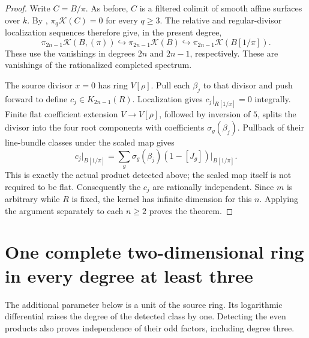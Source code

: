 \documentclass[11pt,a4paper]{amsart}
\numberwithin{equation}{section}
\theoremstyle{definition}
\theoremstyle{remark}
\begin{document}
\begin{proof}
Write $C=B/\pi$.  As before, $C$ is a filtered colimit of smooth
affine surfaces over $k$.  By
\cite[Theorem~8.4]{GeisserLevineCharP},
$\pi_q\mathcal K(C)=0$ for every $q\geq3$.
The relative and regular-divisor localization sequences therefore
give, in the present degree,
\[
 \pi_{2n-1}\mathcal K(B,(\pi))
 \hookrightarrow\pi_{2n-1}\mathcal K(B)
 \hookrightarrow\pi_{2n-1}\mathcal K(B[1/\pi]).
\]
These use the vanishings in degrees $2n$ and $2n-1$, respectively.
These are vanishings of the rationalized completed spectrum.

The source divisor $x=0$ has ring $V[\rho]$.
Pull each $\beta_j$ to that divisor and push forward to define
$c_j\in K_{2n-1}(R)$.  Localization gives $c_j|_{R[1/x]}=0$
integrally.  Finite flat coefficient extension $V\to V[\rho]$,
followed by inversion of $5$, splits the divisor into the four
root components with coefficients $\sigma_g(\beta_j)$.
Pullback of their line-bundle classes under the scaled map gives
\[
 c_j|_{B[1/\pi]}
   =\sum_g\sigma_g(\beta_j)(1-[J_g])\big|_{B[1/\pi]}.
\]
This is exactly the actual product detected above; the scaled map
itself is not required to be flat.
Consequently the $c_j$ are rationally independent.
Since $m$ is arbitrary while $R$ is fixed, the kernel has infinite
dimension for this $n$.  Applying the argument separately to each
$n\geq2$ proves the theorem.
\end{proof}

\section{One complete two-dimensional ring in every degree at least three}
\label{d2ext:dimtwoAllDegreesFixedRing}

The additional parameter below is a unit of the source ring.
Its logarithmic differential raises the degree of the detected
class by one.  Detecting the even products also proves independence
of their odd factors, including degree three.
\end{document}
